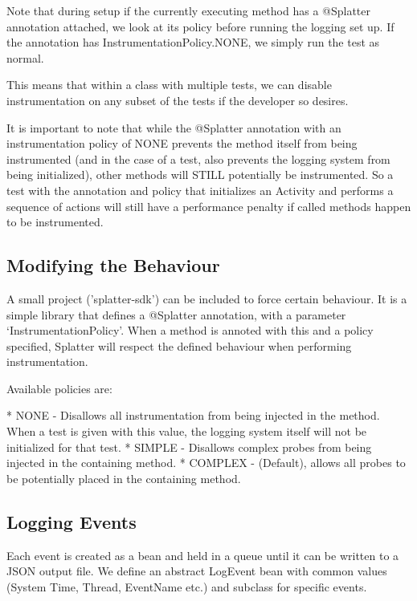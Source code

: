 Note that during setup if the currently executing method has a @Splatter annotation attached, we look at its policy before running the logging set up. If the annotation has InstrumentationPolicy.NONE, we simply run the test as normal.

This means that within a class with multiple tests, we can disable instrumentation on any subset of the tests if the developer so desires.

It is important to note that while the @Splatter annotation with an instrumentation policy of NONE prevents the method itself from being instrumented (and in the case of a test, also prevents the logging system from being initialized), other methods will STILL potentially be instrumented. So a test with the annotation and policy that initializes an Activity and performs a sequence of actions will still have a performance penalty if called methods happen to be instrumented.

\subsection{Modifying the Behaviour}

A small project ('splatter-sdk') can be included to force certain behaviour. It is a simple library that defines a @Splatter annotation, with a parameter {\lq}InstrumentationPolicy{\rq}. When a method is annoted with this and a policy specified, Splatter will respect the defined behaviour when performing instrumentation.

Available policies are:

* NONE - Disallows all instrumentation from being injected in the method. When a test is given with this value, the logging system itself will not be initialized for that test.
* SIMPLE - Disallows complex probes from being injected in the containing method.
* COMPLEX - (Default), allows all probes to be potentially placed in the containing method.

\subsection{Logging Events}

Each event is created as a bean and held in a queue until it can be written to a JSON output file. We define an abstract LogEvent bean with common values (System Time, Thread, EventName etc.) and subclass for specific events.



